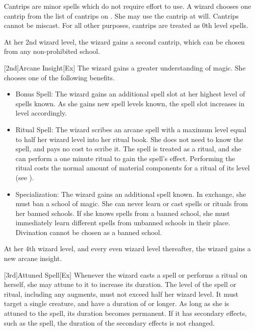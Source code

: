 Cantrips are minor spells which do not require effort to use.
A wizard chooses one cantrip from the list of cantrips on .
She may use the cantrip at will.
Cantrips cannot be miscast.
For all other purposes, cantrips are treated as 0th level spells.

At her 2nd wizard level, the wizard gains a second cantrip, which can be chosen from any non-prohibited school.

[2nd]{Arcane Insight}[Ex]\label{Arcane Insight}
The wizard gains a greater understanding of magic.
She chooses one of the following benefits.
\begin{itemize}
    \item Bonus Spell: The wizard gains an additional spell slot at her highest level of spells known.
        As she gains new spell levels known, the spell slot increases in level accordingly.
    \item Ritual Spell: The wizard scribes an arcane spell with a maximum level equal to half her wizard level into her ritual book.
        She does not need to know the spell, and pays no cost to scribe it.
        The spell is treated as a ritual, and she can perform a one minute ritual to gain the spell's effect.
        Performing the ritual costs the normal amount of material components for a ritual of its level (see ).
    \item Specialization: The wizard gains an additional spell known.
        In exchange, she must ban a school of magic.
        She can never learn or cast spells or rituals from her banned schools.
        If she knows spells from a banned school, she must immediately learn different spells from unbanned schools in their place.
        Divination cannot be chosen as a banned school.
\end{itemize}

At her 4th wizard level, and every even wizard level thereafter, the wizard gains a new arcane insight.

[3rd]{Attuned Spell}[Ex]
Whenever the wizard casts a spell or performs a ritual on herself, she may attune to it to increase its duration.
The level of the spell or ritual, including any augments, must not exceed half her wizard level.
It must target a single creature, and have a duration of \durshort or longer.
As long as she is attuned to the spell, its duration becomes permanent.
If it has secondary effects, such as the  spell, the duration of the secondary effects is not changed.

